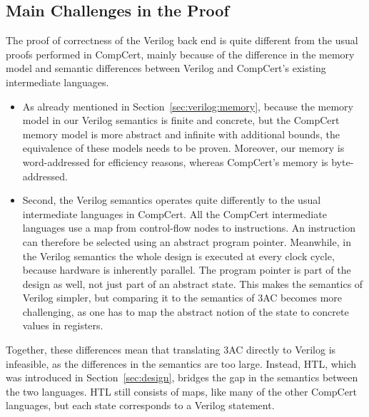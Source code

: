 \subsection{Main Challenges in the Proof}

The proof of correctness of the Verilog back end is quite different from the usual proofs performed in CompCert, mainly because of the difference in the memory model and semantic differences between Verilog and CompCert's existing intermediate languages.

\begin{itemize}
\item As already mentioned in Section~\ref{sec:verilog:memory}, because the
  memory model in our Verilog semantics is finite and concrete, but the CompCert
  memory model is more abstract and infinite with additional bounds, the
  equivalence of these models needs to be proven.  Moreover, our memory is
  word-addressed for efficiency reasons, whereas CompCert's memory is
  byte-addressed.


\item Second, the Verilog semantics operates quite differently to the usual
  intermediate languages in CompCert.  All the CompCert intermediate languages
  use a map from control-flow nodes to instructions.  An instruction can
  therefore be selected using an abstract program pointer. Meanwhile, in the
  Verilog semantics the whole design is executed at every clock cycle, because
  hardware is inherently parallel. The program pointer is part of the design as
  well, not just part of an abstract state. This makes the semantics of Verilog
  simpler, but comparing it to the semantics of 3AC becomes more challenging, as
  one has to map the abstract notion of the state to concrete values in
  registers.
\end{itemize}

Together, these differences mean that translating 3AC directly to Verilog is
infeasible, as the differences in the semantics are too large.  Instead, HTL,
which was introduced in Section~\ref{sec:design}, bridges the gap in the
semantics between the two languages.  HTL still consists of maps, like many of
the other CompCert languages, but each state corresponds to a Verilog statement.

